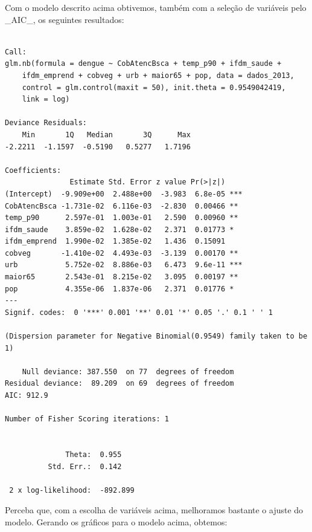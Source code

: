\documentclass[12pt,a4paper]{article}\usepackage[]{graphicx}\usepackage[]{color}
\makeatletter
\newenvironment{kframe}{%
 \def\at@end@of@kframe{}%
 \ifinner\ifhmode%
  \def\at@end@of@kframe{\end{minipage}}%
  \begin{minipage}{\columnwidth}%
 \fi\fi%
 \def\FrameCommand##1{\hskip\@totalleftmargin \hskip-\fboxsep
 \colorbox{shadecolor}{##1}\hskip-\fboxsep
     \hskip-\linewidth \hskip-\@totalleftmargin \hskip\columnwidth}%
 \MakeFramed {\advance\hsize-\width
   \@totalleftmargin\z@ \linewidth\hsize
   \@setminipage}}%
 {\par\unskip\endMakeFramed%
 \at@end@of@kframe}
\newenvironment{knitrout}{}{} %
\makeatother
\begin{document}
Com o modelo descrito acima obtivemos, também com a seleção de variáveis pelo \_AIC\_, os seguintes resultados:
\begin{knitrout}
\color{fgcolor}\begin{kframe}
\begin{verbatim}

Call:
glm.nb(formula = dengue ~ CobAtencBsca + temp_p90 + ifdm_saude + 
    ifdm_emprend + cobveg + urb + maior65 + pop, data = dados_2013, 
    control = glm.control(maxit = 50), init.theta = 0.9549042419, 
    link = log)

Deviance Residuals: 
    Min       1Q   Median       3Q      Max  
-2.2211  -1.1597  -0.5190   0.5277   1.7196  

Coefficients:
               Estimate Std. Error z value Pr(>|z|)    
(Intercept)  -9.909e+00  2.488e+00  -3.983  6.8e-05 ***
CobAtencBsca -1.731e-02  6.116e-03  -2.830  0.00466 ** 
temp_p90      2.597e-01  1.003e-01   2.590  0.00960 ** 
ifdm_saude    3.859e-02  1.628e-02   2.371  0.01773 *  
ifdm_emprend  1.990e-02  1.385e-02   1.436  0.15091    
cobveg       -1.410e-02  4.493e-03  -3.139  0.00170 ** 
urb           5.752e-02  8.886e-03   6.473  9.6e-11 ***
maior65       2.543e-01  8.215e-02   3.095  0.00197 ** 
pop           4.355e-06  1.837e-06   2.371  0.01776 *  
---
Signif. codes:  0 '***' 0.001 '**' 0.01 '*' 0.05 '.' 0.1 ' ' 1

(Dispersion parameter for Negative Binomial(0.9549) family taken to be 1)

    Null deviance: 387.550  on 77  degrees of freedom
Residual deviance:  89.209  on 69  degrees of freedom
AIC: 912.9

Number of Fisher Scoring iterations: 1


              Theta:  0.955 
          Std. Err.:  0.142 

 2 x log-likelihood:  -892.899 
\end{verbatim}
\end{kframe}
\end{knitrout}
Perceba que, com a escolha de variáveis acima, melhoramos bastante o ajuste do modelo. Gerando os gráficos para o modelo acima, obtemos:
\end{document}
